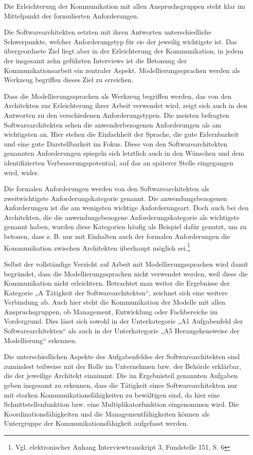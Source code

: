 Die Erleichterung der Kommunikation mit allen Anspruchsgruppen steht klar im Mittelpunkt der formulierten Anforderungen. 

Die Softwarearchitekten setzten mit ihren Antworten unterschiedliche Schwerpunkte, welcher Anforderungstyp für sie der jeweilig wichtigste ist. Das übergeordnete Ziel liegt aber in der Erleichterung der Kommunikation, in jedem der insgesamt zehn geführten Interviews ist die Betonung der Kommunikationsarbeit ein zentraler Aspekt. Modellierungssprachen werden als Werkzeug begriffen dieses Ziel zu erreichen.

Dass die Modellierungssprachen als Werkzeug begriffen werden, das von den Architekten zur Erleichterung ihrer Arbeit verwendet wird, zeigt sich auch in den Antworten zu den verschiedenen Anforderungstypen. Die meisten befragten Softwarearchitekten sehen die anwenderbezogenen Anforderungen als am wichtigsten an. Hier stehen die Einfachheit der Sprache, die gute Erlernbarkeit und eine gute Darstellbarkeit im Fokus. Diese von den Softwarearchitekten genannten Anforderungen spiegeln sich letztlich auch in den Wünschen und dem identifizierten Verbesserungspotential, auf das an späterer Stelle eingegangen wird, wider.

Die formalen Anforderungen werden von den Softwarearchitekten als zweitwichtigste Anforderungskategorie genannt. Die anwendungsbezogenen Anforderungen ist die am wenigsten wichtige Anforderungsart. Doch auch bei den Architekten, die die anwendungsbezogene Anforderungskategorie als wichtigste genannt haben, wurden diese Kategorien häufig als Beispiel dafür genutzt, um zu betonen, dass z. B. nur mit Einhalten auch der formalen Anforderungen die Kommunikation zwischen Architekten überhaupt möglich sei.\footnote {Vgl. elektronischer Anhang Interviewtranskript 3, Fundstelle 151, S. 6 }

Selbst der vollständige Verzicht auf Arbeit mit Modellierungssprachen wird damit begründet, dass die Modellierungssprachen nicht verwendet werden, weil diese die Kommunikation nicht erleichtern.
Betrachtet man weiter die Ergebnisse der Kategorie „A Tätigkeit der Softwarearchitekten“, zeichnet sich eine weitere Verbindung ab. Auch hier steht die Kommunikation der Modelle mit allen Anspruchsgruppen, ob Management, Entwicklung oder Fachbereiche im Vordergrund. Dies lässt sich sowohl in der Unterkategorie „A1 Aufgabenfeld der Softwarearchitekten“ als auch in der Unterkategorie „A5 Herangehensweise der Modellierung“ erkennen. 

Die unterschiedlichen Aspekte des Aufgabenfeldes der Softwarearchitekten sind zumindest teilweise mit der Rolle im Unternehmen bzw. der Behörde erklärbar, die der jeweilige Architekt einnimmt. Die im Ergebnisteil genannten Aufgaben geben insgesamt zu erkennen, dass die Tätigkeit eines Softwarearchitekten nur mit starken Kommunikationsfähigkeiten zu bewältigen sind, da hier eine Schnittstellenfunktion bzw. eine Multiplikatorfunktion eingenommen wird. Die Koordinationsfähigkeiten und die Managementfähigkeiten können als Untergruppe der Kommunikationsfähigkeit aufgefasst werden.

